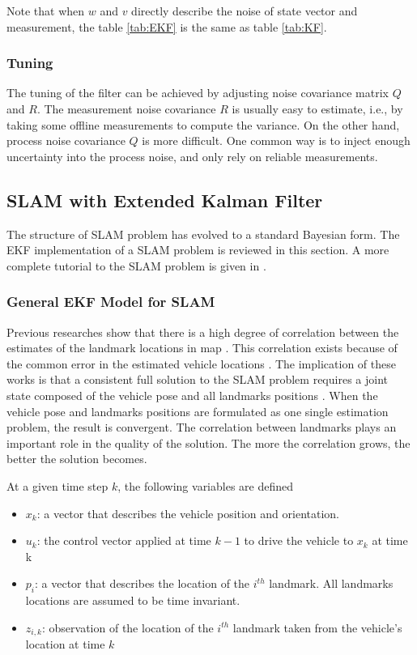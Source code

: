 \noindent Note that when $w$ and $v$ directly describe the noise of
state vector and measurement, the table \ref{tab:EKF} is the same as
table \ref{tab:KF}.

\subsubsection{Tuning}
The tuning of the filter can be achieved by adjusting noise covariance
matrix $Q$ and $R$. The measurement noise covariance $R$ is usually
easy to estimate, i.e., by taking some offline measurements to compute
the variance. On the other hand, process noise covariance $Q$ is more
difficult. One common way is to inject enough uncertainty into the
process noise, and only rely on reliable measurements.
 
\subsection{SLAM with Extended Kalman Filter}
The structure of SLAM problem has evolved to a standard
Bayesian form. The EKF implementation of a SLAM problem is reviewed in
this section. A more complete tutorial to the SLAM problem is given in
\cite{durrant-whyte_simultaneous_2006}
\cite{bailey_simultaneous_2006}.

\subsubsection{General EKF Model for SLAM}
Previous researches show that there is a high degree of correlation
between the estimates of the landmark locations in map
\cite{smith_representation_1986} \cite{durrant-whyte_uncertain_1988}.
This correlation exists because of the common error in the estimated
vehicle locations \cite{leonard_simultaneous_1991}. The implication of
these works is that a consistent full solution to the SLAM problem
requires a joint state composed of the vehicle pose and all landmarks
positions \cite{durrant-whyte_simultaneous_2006}. When the vehicle pose
and landmarks positions are formulated as one single estimation
problem, the result is convergent. The correlation between landmarks
plays an important role in the quality of the solution. The more the
correlation grows, the better the solution becomes.
\cite{durrant-whyte_localization_1996} \cite{csorba_new_1996}
\cite{csorba_simultaneous_1997} \cite{dissanayake_solution_2001}

At a given time step $k$, the following variables are defined
\begin{itemize}
  \item $x_k$: a vector that describes the vehicle position and
orientation.
  \item $u_k$: the control vector applied at time $k-1$ to drive the
vehicle to $x_k$ at time k
  \item $p_i$: a vector that describes the location of the $i^{th}$
landmark. All landmarks locations are assumed to be time invariant.
  \item $z_{i,k}$: observation of the location of the $i^{th}$
landmark taken from the vehicle's location at time $k$
\end{itemize}

